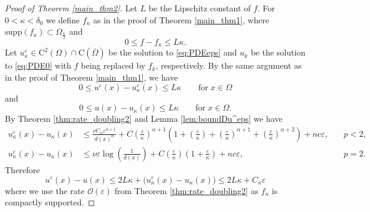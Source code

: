 \documentclass[12pt,reqno]{amsart}
\numberwithin{figure}{section}
\theoremstyle{plain}
\theoremstyle{remark}
\numberwithin{equation}{section}
\newcommand{\rmC}{\mathrm{C}}
\begin{document}
\begin{proof}[Proof of Theorem \ref{main_thm2}] Let $L$ be the Lipschitz constant of $f$. For $0 < \kappa <\delta_0$ we define $f_\kappa$ as in the proof of Theorem \ref{main_thm1}, where $\mathrm{supp}(f_\kappa)\subset\Omega_{\frac{\kappa}{2}}$ and
\begin{equation*}
    0\leq f - f_\kappa \leq L\kappa.
\end{equation*}
Let $u^\varepsilon_\kappa\in \rmC^2(\Omega)\cap \rmC(\overline{\Omega})$ be the solution to \eqref{eq:PDEeps} and $u_k$ be the solution to \eqref{eq:PDE0} with $f$ being replaced by $f_k$, respectively. By the same argument as in the proof of Theorem \ref{main_thm1}, we have
\begin{equation*}
  0\leq u^\varepsilon(x) - u^\varepsilon_\kappa(x)\leq L\kappa \qquad\text{for}\;x\in \Omega
\end{equation*}
and
\begin{equation*}
    0\leq u(x) - u_\kappa(x)\leq L\kappa \qquad\text{for}\;x\in \Omega.
\end{equation*}
By Theorem \ref{thm:rate_doubling2} and Lemma \ref{lem:boundDu^eps} we have 
\begin{equation*}
\begin{aligned}
    u_\kappa^\varepsilon(x) - u_\kappa(x) &\leq\frac{\nu C_\alpha \varepsilon^{\alpha+1}}{d(x)^\alpha} + C\left(\frac{\varepsilon}{\kappa}\right)^{\alpha+1} \left(1+ \left(\frac{\varepsilon}{\kappa}\right) +\left(\frac{\varepsilon}{\kappa}\right)^{\alpha+1} +\left(\frac{\varepsilon}{\kappa}\right)^{\alpha+2}\right) + nc\varepsilon,  &\quad p <2, \\
    u_\kappa^\varepsilon(x) - u_\kappa(x) & \leq \nu \varepsilon \log\left( \frac{1}{d(x)}\right)+C\left(\frac{\varepsilon}{\kappa}\right) \left(1+\frac{\varepsilon}{\kappa}\right)+ nc \varepsilon, &\quad p=2.
\end{aligned}
\end{equation*}
Therefore
\begin{equation*}
    u^\varepsilon(x)-u(x)\leq 2L\kappa + \Big(u^\varepsilon_\kappa(x) - u_\kappa(x)\Big) \leq 2L\kappa+C_{\kappa}\varepsilon
\end{equation*}
where we use the rate $\mathcal{O}(\varepsilon)$ from Theorem \ref{thm:rate_doubling2} as $f_\kappa$ is compactly supported. 

\end{proof}




\end{document}
